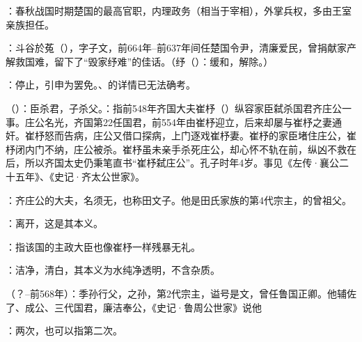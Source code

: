 {
\item {}：春秋战国时期楚国的最高官职，内理政务（相当于宰相），外掌兵权，多由王室亲族担任。
\item {}：斗谷於菟（），字子文，前664年--前637年间任楚国令尹，清廉爱民，曾捐献家产解救国难，留下了“毁家纾难”的佳话。（纾（）：缓和，解除。）

\item {}：停止，引申为罢免。、的详情已无法确考。

\item {}（）：臣杀君，子杀父。：指前548年齐国大夫崔杼（）纵容家臣弑杀国君齐庄公一事。庄公名光，齐国第22任国君，前554年由崔杼迎立，后来却屡与崔杼之妻通奸。崔杼怒而告病，庄公又借口探病，上门逐戏崔杼妻。崔杼的家臣堵住庄公，崔杼闭内门不纳，庄公被杀。崔杼虽未亲手杀死庄公，却心怀不轨在前，纵凶不救在后，所以齐国太史仍秉笔直书“崔杼弑庄公”。孔子时年4岁。事见《左传·襄公二十五年》、《史记·齐太公世家》。
\item {}：齐庄公的大夫，名须无，也称田文子。他是田氏家族的第4代宗主，的曾祖父。
\item {}：离开，这是其本义。
\item {}：指该国的主政大臣也像崔杼一样残暴无礼。
\item {}：洁净，清白，其本义为水纯净透明，不含杂质。
}
{}


{
\item {}（？--前568年）：季孙行父，之孙，第2代宗主，谥号是文，曾任鲁国正卿。他辅佐了、成公、三代国君，廉洁奉公，《史记·鲁周公世家》说他
\item {}：两次，也可以指第二次。
}
{}


